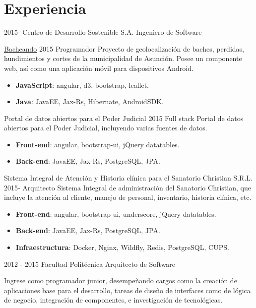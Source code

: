 \documentclass[]{friggeri-cv}
\begin{document}
\section{Experiencia}
\begin{entrylist}
\entry
    {2015-}
    {Centro de Desarrollo Sostenible S.A.}
    {Ingeniero de Software}
    {\proyecto
        {\href{http://bacheando.com/}{Bacheando}}
        {2015}
        {Programador}
        {Proyecto de geolocalización de baches, perdidas, hundimientos y
            cortes de la municipalidad de Asunción.
            Posee un componente web, así como una aplicación móvil para
            dispositivos Android.}
        {\begin{itemize}
            \item \textbf{JavaScript}: angular, d3, bootstrap, leaflet.
            \item \textbf{Java}: JavaEE, Jax-Rs, Hibernate, AndroidSDK.
        \end{itemize}} 
    \proyecto
        {Portal de datos abiertos para el Poder Judicial}
        {2015}
        {Full stack}
        {Portal de datos abiertos para el Poder Judicial, incluyendo varias
        	fuentes de datos.}
        {\begin{itemize}
            \item \textbf{Front-end}: angular, bootstrap-ui, jQuery datatables.
            \item \textbf{Back-end}: JavaEE, Jax-Rs, PostgreSQL, JPA.
        \end{itemize}} 
    \proyecto
        {Sistema Integral de Atención y Historia clínica para el Sanatorio Christian S.R.L.}
        {2015-}
        {Arquitecto}
        {Sistema Integral de administración del Sanatorio Christian, que incluye la atención 
        	al cliente, manejo de personal, inventario, historia clínica, etc.}
        {\begin{itemize}
            \item \textbf{Front-end}: angular, bootstrap-ui, underscore, jQuery datatables.
            \item \textbf{Back-end}: JavaEE, Jax-Rs, PostgreSQL, JPA.
            \item \textbf{Infraestructura}: Docker, Nginx, Wildfly, Redis, PostgreSQL, CUPS.
        \end{itemize}} }

\entry
    {2012 - 2015}
    {Facultad Politécnica}
    {Arquitecto de Software}
    {Ingrese como programador junior, desempeñando cargos como la creación de
        aplicaciones base para el desarrollo, tareas de diseño de interfaces
        como de lógica de negocio, integración de componentes, e investigación
        de tecnológicas.

}
\end{entrylist}
\end{document}
